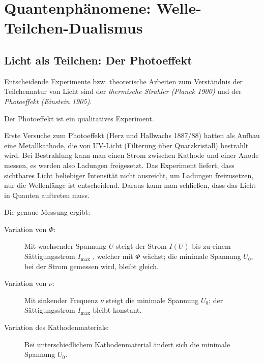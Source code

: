 
\chapter[Quantenphänomene]%
{Quantenphänomene: Welle-Teilchen-Dualismus}

\section[Der Photoeffekt]{Licht als Teilchen: Der Photoeffekt}
Entscheidende Experimente bzw. theoretische Arbeiten zum Verständnis
der Teilchennatur von Licht sind der
\emph{thermische Strahler (Planck 1900)} 
und der \emph{Photoeffekt (Einstein 1905)}.

Der Photoeffekt ist ein qualitatives Experiment.

Erste Versuche zum Photoeffekt (Herz und Hallwachs 1887/88) hatten als
Aufbau eine Metallkathode, die von UV-Licht (Filterung über
Quarzkristall) bestrahlt wird. Bei Bestrahlung kann man einen Strom
zwischen Kathode und einer Anode messen, es werden also Ladungen
freigesetzt.
Das Experiment liefert, dass sichtbares Licht beliebiger Intensität
nicht ausreicht, um Ladungen freizusetzen, nur die Wellenlänge ist
entscheidend.
Daraus kann man schließen, dass das Licht in Quanten auftreten muss.

Die genaue Messung ergibt:
\begin{description}
\item[Variation von $\Phi$:] Mit wachsender Spannung $U$
  steigt der Strom $I(U)$ bis zu einem Sättigungsstrom $I_\text{max}$%
  , 
  welcher mit $\Phi$ wächst;
  die minimale Spannung $U_0$, bei der Strom gemessen
  wird, bleibt gleich.

\item[Variation von $\nu$:] Mit sinkender Frequenz $\nu$ steigt die
  minimale Spannung $U_0$; der Sättigungsstrom $I_\text{max}$ bleibt konstant. 

\item[Variation des Kathodenmaterials:] Bei unterschiedlichem
  Kathodenmaterial ändert sich die minimale Spannung $U_0$.
\end{description}

